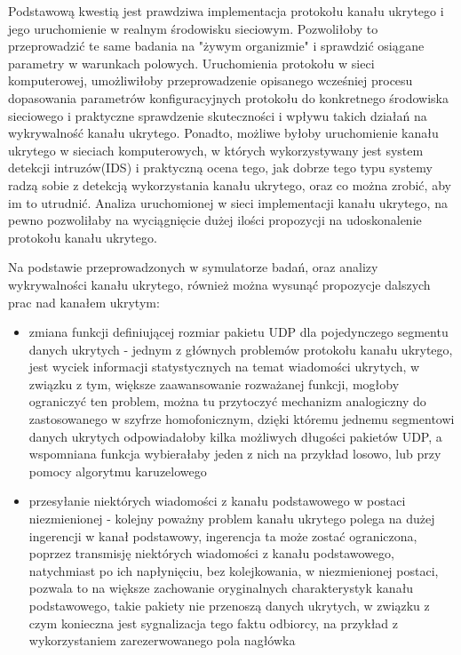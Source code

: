 \documentclass[a4paper, twoside, 12pt]{report}
\begin{document}
    Podstawową kwestią jest prawdziwa implementacja protokołu kanału ukrytego
    i jego uruchomienie w realnym środowisku sieciowym. Pozwoliłoby to przeprowadzić
    te same badania na "żywym organizmie" i sprawdzić osiągane parametry w warunkach polowych.
    Uruchomienia protokołu w sieci komputerowej, umożliwiłoby przeprowadzenie opisanego
    wcześniej procesu dopasowania parametrów konfiguracyjnych protokołu do konkretnego
    środowiska sieciowego i praktyczne sprawdzenie skuteczności i wpływu takich
    działań na wykrywalność kanału ukrytego. Ponadto, możliwe byłoby uruchomienie
    kanału ukrytego w sieciach komputerowych, w których wykorzystywany jest system
    detekcji intruzów(IDS) i praktyczną ocena tego, jak dobrze tego typu systemy
    radzą sobie z detekcją wykorzystania kanału ukrytego, oraz co można zrobić,
    aby im to utrudnić. Analiza uruchomionej w sieci implementacji kanału ukrytego,
    na pewno pozwoliłaby na wyciągnięcie dużej ilości propozycji na udoskonalenie
    protokołu kanału ukrytego.

    Na podstawie przeprowadzonych w symulatorze badań, oraz analizy wykrywalności
    kanału ukrytego, również można wysunąć propozycje dalszych prac nad kanałem ukrytym:

    \begin{itemize}
        \item zmiana funkcji definiującej rozmiar pakietu UDP dla pojedynczego segmentu danych ukrytych -
            jednym z głównych problemów protokołu kanału ukrytego, jest wyciek
            informacji statystycznych na temat wiadomości ukrytych, w związku z tym,
            większe zaawansowanie rozważanej funkcji, mogłoby ograniczyć ten problem,
            można tu przytoczyć mechanizm analogiczny do zastosowanego w szyfrze
            homofonicznym, dzięki któremu jednemu segmentowi danych ukrytych
            odpowiadałoby kilka możliwych długości pakietów UDP, a wspomniana funkcja
            wybierałaby jeden z nich na przykład losowo, lub przy pomocy algorytmu
            karuzelowego
        \item przesyłanie niektórych wiadomości z kanału podstawowego w postaci niezmienionej -
            kolejny poważny problem kanału ukrytego polega na dużej ingerencji w
            kanał podstawowy, ingerencja ta może zostać ograniczona, poprzez
            transmisję niektórych wiadomości z kanału podstawowego, natychmiast
            po ich napłynięciu, bez kolejkowania, w niezmienionej postaci,
            pozwala to na większe zachowanie oryginalnych charakterystyk kanału
            podstawowego, takie pakiety nie przenoszą danych ukrytych, w związku
            z czym konieczna jest sygnalizacja tego faktu odbiorcy, na przykład
            z wykorzystaniem zarezerwowanego pola nagłówka
    \end{itemize}

\clearpage
{}


\end{document}
